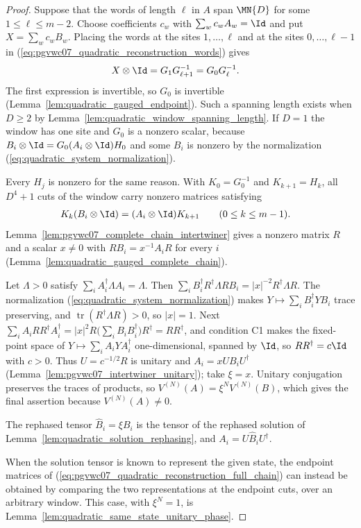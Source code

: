 \begin{proof}
    Suppose that the words of length $\ell$ in $A$ span $\MN{D}$ for some
    $1\le\ell\le m-2$. Choose coefficients $c_w$ with
    $\sum_wc_wA_w=\Id$ and put $X=\sum_wc_wB_w$. Placing the words at the
    sites $1,\ldots,\ell$ and at the sites $0,\ldots,\ell-1$ in
    (\ref{eq:pgvwc07_quadratic_reconstruction_words}) gives
    \begin{align}
        X\otimes\Id & =G_1G_{\ell+1}^{-1}=G_0G_\ell^{-1}.
        \label{eq:pgvwc07_quadratic_reconstruction_endpoints}
    \end{align}
    The first expression is invertible, so $G_0$ is invertible
    (Lemma~\ref{lem:quadratic_gauged_endpoint}). Such a spanning length
    exists when $D\ge2$ by Lemma~\ref{lem:quadratic_window_spanning_length}.
    If $D=1$ the window has one site and $G_0$ is a nonzero scalar, because
    $B_i\otimes\Id=G_0(A_i\otimes\Id)H_0$ and some $B_i$ is nonzero by the
    normalization (\ref{eq:quadratic_system_normalization}).

    Every $H_j$ is nonzero for the same reason. With $K_0=G_0^{-1}$ and
    $K_{k+1}=H_k$, all $D^4+1$ cuts of the window carry nonzero matrices
    satisfying
    \begin{align}
        K_k(B_i\otimes\Id) & =(A_i\otimes\Id)K_{k+1}
        \qquad(0\le k\le m-1).
        \label{eq:pgvwc07_quadratic_reconstruction_full_chain}
    \end{align}
    Lemma~\ref{lem:pgvwc07_complete_chain_intertwiner} gives a nonzero
    matrix $R$ and a scalar $x\neq0$ with $RB_i=x^{-1}A_iR$ for every $i$
    (Lemma~\ref{lem:quadratic_gauged_complete_chain}).

    Let $\Lambda>0$ satisfy $\sum_iA_i^{\dagger}\Lambda A_i=\Lambda$. Then
    $\sum_iB_i^{\dagger}R^{\dagger}\Lambda RB_i=|x|^{-2}R^{\dagger}\Lambda R$.
    The normalization (\ref{eq:quadratic_system_normalization}) makes
    $Y\mapsto\sum_iB_i^{\dagger}YB_i$ trace preserving, and
    $\operatorname{tr}(R^{\dagger}\Lambda R)>0$, so $|x|=1$. Next
    $\sum_iA_iRR^{\dagger}A_i^{\dagger}
        =|x|^2R\bigl(\sum_iB_iB_i^{\dagger}\bigr)R^{\dagger}=RR^{\dagger}$,
    and condition C1 makes the fixed-point space of
    $Y\mapsto\sum_iA_iYA_i^{\dagger}$ one-dimensional, spanned by $\Id$,
    so $RR^{\dagger}=c\Id$ with $c>0$. Thus $U=c^{-1/2}R$ is unitary and
    $A_i=xUB_iU^{\dagger}$ (Lemma~\ref{lem:pgvwc07_intertwiner_unitary});
    take $\xi=x$. Unitary conjugation preserves the
    traces of products, so $V^{(N)}(A)=\xi^NV^{(N)}(B)$, which gives the
    final assertion because $V^{(N)}(A)\neq0$.

    The rephased tensor $\widehat B_i=\xi B_i$ is the tensor of the rephased
    solution of Lemma~\ref{lem:quadratic_solution_rephasing}, and
    $A_i=U\widehat B_iU^{\dagger}$.

    When the solution tensor is known to represent the given state, the
    endpoint matrices of (\ref{eq:pgvwc07_quadratic_reconstruction_full_chain})
    can instead be obtained by comparing the two representations at the
    endpoint cuts, over an arbitrary window. This case, with $\xi^N=1$, is
    Lemma~\ref{lem:quadratic_same_state_unitary_phase}.
\end{proof}

